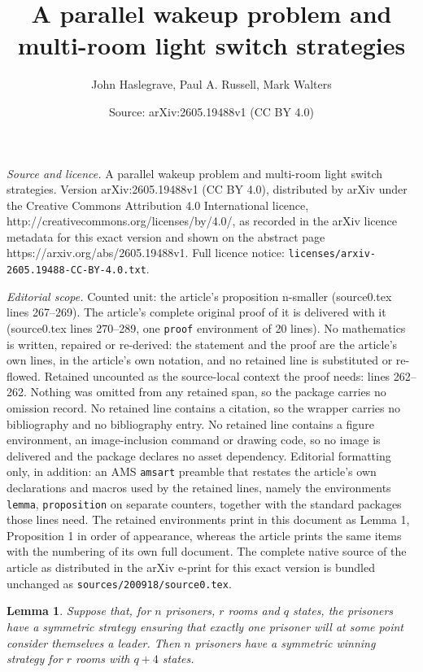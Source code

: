 \documentclass[10pt,a4paper]{amsart}
\title{A parallel wakeup problem and multi-room light switch strategies}
\author{John Haslegrave, Paul A. Russell, Mark Walters}
\date{Source: arXiv:2605.19488v1 (CC BY 4.0)}
\newtheorem{lemma}{Lemma}
\begin{document}
\maketitle

\noindent\emph{Source and licence.} A parallel wakeup problem and multi-room light switch strategies. Version arXiv:2605.19488v1 (CC BY 4.0), distributed by arXiv under the Creative Commons Attribution 4.0 International licence, http://creativecommons.org/licenses/by/4.0/, as recorded in the arXiv licence metadata for this exact version and shown on the abstract page https://arxiv.org/abs/2605.19488v1. Full licence notice: \texttt{licenses/arxiv-2605.19488-CC-BY-4.0.txt}.\par\smallskip

\noindent\textit{Editorial scope.} Counted unit: the article's proposition n-smaller (source0.tex lines 267--269). The article's complete original proof of it is delivered with it (source0.tex lines 270--289, one \texttt{proof} environment of 20 lines). No mathematics is written, repaired or re-derived: the statement and the proof are the article's own lines, in the article's own notation, and no retained line is substituted or re-flowed.  Retained uncounted as the source-local context the proof needs: lines 262--262.  Nothing was omitted from any retained span, so the package carries no omission record.  No retained line contains a citation, so the wrapper carries no bibliography and no bibliography entry.  No retained line contains a figure environment, an image-inclusion command or drawing code, so no image is delivered and the package declares no asset dependency.  Editorial formatting only, in addition: an AMS \texttt{amsart} preamble that restates the article's own declarations and macros used by the retained lines, namely the environments \texttt{lemma}, \texttt{proposition} on separate counters, together with the standard packages those lines need.  The retained environments print in this document as Lemma 1, Proposition 1 in order of appearance, whereas the article prints the same items with the numbering of its own full document.  The complete native source of the article as distributed in the arXiv e-print for this exact version is bundled unchanged as \texttt{sources/200918/source0.tex}.
	\begin{lemma}\label{leader-wins}Suppose that, for $n$ prisoners, $r$ rooms and $q$ states, the prisoners have a symmetric strategy ensuring that exactly one prisoner will at some point consider themselves a leader. Then $n$ prisoners have a symmetric winning strategy for $r$ rooms with $q+4$ states.\end{lemma}
\end{document}
